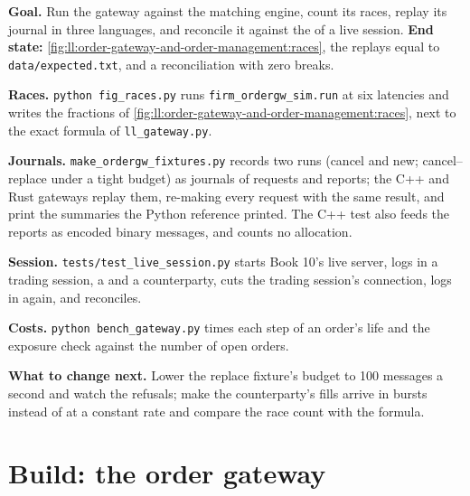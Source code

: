 \begin{tutorial}
\textbf{Goal.} Run the gateway against the matching engine, count its races, replay its journal in three languages, and
reconcile it against the  of a live session. \textbf{End state:}
\cref{fig:ll:order-gateway-and-order-management:races}, the replays equal to \texttt{data/expected.txt}, and a reconciliation
with zero breaks.
\begin{tutsteps}
\item \textbf{Races.} \texttt{python fig\_races.py} runs \texttt{firm\_ordergw\_sim.run} at six latencies and writes the
fractions of \cref{fig:ll:order-gateway-and-order-management:races}, next to the exact formula of \texttt{ll\_gateway.py}.
\item \textbf{Journals.} \texttt{make\_ordergw\_fixtures.py} records two runs (cancel and new; cancel--replace under a tight
budget) as journals of requests and reports; the C++ and Rust gateways replay them, re-making every request with the same
result, and print the summaries the Python reference printed. The C++ test also feeds the reports as encoded binary messages,
and counts no allocation.
\item \textbf{Session.} \texttt{tests/test\_live\_session.py} starts Book 10's live server, logs in a trading session, a  and a counterparty, cuts the trading session's connection, logs in again, and reconciles.
\item \textbf{Costs.} \texttt{python bench\_gateway.py} times each step of an order's life and the exposure check against the
number of open orders.
\end{tutsteps}
\textbf{What to change next.} Lower the replace fixture's budget to 100 messages a second and watch the refusals; make the
counterparty's fills arrive in bursts instead of at a constant rate and compare the race count with the formula.
\end{tutorial}

\section{Build: the order gateway}\label{bld:ll:order-gateway-and-order-management:ordergw}

